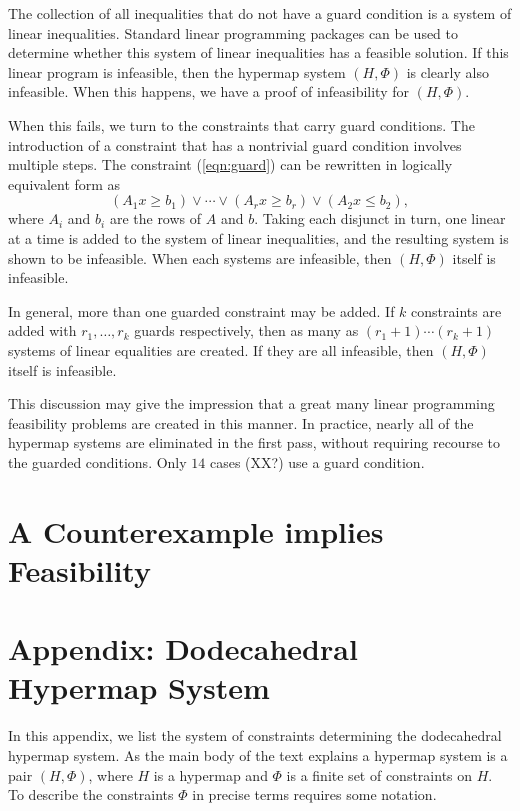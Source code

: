 The collection of all inequalities that do not have a guard 
condition is a system of linear inequalities.  Standard linear
programming packages can be used to determine whether this
system of linear inequalities has a feasible solution.  If this
linear program is infeasible, then the hypermap system $(H,\Phi)$
is clearly also infeasible.  When this happens, we have a
proof of infeasibility for $(H,\Phi)$.

When this fails, we turn to the constraints that carry guard
conditions.
The introduction of a constraint that has a nontrivial guard condition
involves multiple steps.  
The constraint (\ref{eqn:guard}) can be rewritten in logically
equivalent form as
  $$
   (A_{1} x \ge b_{1}) \lor \cdots \lor
   (A_{r} x \ge b_{r}) \lor (A_2 x \le b_2),
  $$
where $A_{i}$ and $b_{i}$ are the rows of $A$ and $b$.
Taking each disjunct in turn, one linear at a time
is added to the system
of linear inequalities, and the resulting system is shown to be
infeasible.  When each
systems are infeasible, then $(H,\Phi)$ itself is infeasible.

In general, more than one guarded constraint may be added.  If
$k$ constraints are added with $r_1,\ldots,r_k$ guards
respectively, then as many as $(r_1+1)\cdots (r_k+1)$ systems
of linear equalities are created.  If they are all infeasible,
then $(H,\Phi)$ itself is infeasible.

This discussion may give the impression 
that a great many linear programming feasibility
problems are created in this manner.  In practice, nearly all
of the hypermap systems are eliminated in the first pass, without
requiring recourse to the guarded conditions.  Only
$14$ cases (XX?) use a guard condition.



\section{A Counterexample implies Feasibility}




\section{Appendix: Dodecahedral Hypermap System}

In this appendix, we list the system of constraints determining
the dodecahedral hypermap system.  As the main body of the text explains
a hypermap system is a pair $(H,\Phi)$, where $H$ is a hypermap
and $\Phi$ is a finite set of constraints on $H$.  To describe
the constraints $\Phi$ in precise terms requires some notation.

